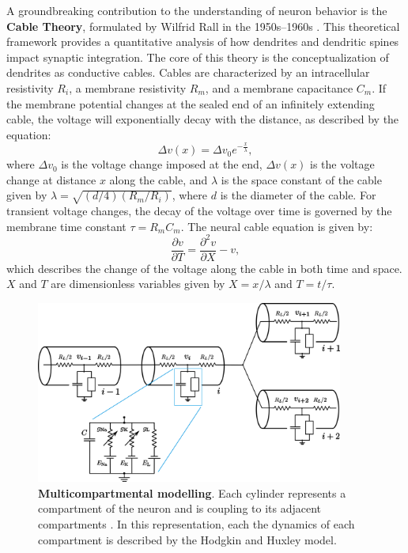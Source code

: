 \documentclass[../main.tex]{subfiles}
\begin{document}
A groundbreaking contribution to the understanding of neuron behavior is the \textbf{Cable Theory}, formulated by Wilfrid Rall in the 1950s–1960s \citep{rall1959branching,rall1962electrophysiology}.
This theoretical framework provides a quantitative analysis of how dendrites and dendritic spines impact synaptic integration.
The core of this theory is the conceptualization of dendrites as conductive cables.
Cables are characterized by an intracellular resistivity $R_i$, a membrane resistivity $R_m$, and a membrane capacitance $C_m$.
If the membrane potential changes at the sealed end of an infinitely extending cable, the voltage will exponentially decay with the distance, as described by the equation: 
\begin{equation}
    \Delta v(x) = \Delta v_0 e^{-\frac{x}{\lambda}},
    \label{eq:cable-equation-decay}
\end{equation}
where $\Delta v_0$ is the voltage change imposed at the end, $\Delta v(x)$ is the voltage change at distance $x$ along the cable, and $\lambda$ is the space constant of the cable given by $\lambda = \sqrt{(d/4)(R_m/R_i)}$, where $d$ is the diameter of the cable.
For transient voltage changes, the decay of the voltage over time is governed by the membrane time constant $\tau = R_mC_m$.
The neural cable equation is given by:
\begin{equation}
    \displaystyle\frac{\partial v}{\partial T} = \displaystyle\frac{\partial^2 v}{\partial X} - v,
\end{equation}
which describes the change of the voltage along the cable in both time and space.
$X$ and $T$ are dimensionless variables given by $X = x/\lambda$ and $T = t/\tau$.
\begin{figure}[!htb]%
    \centering
    \includegraphics[width=0.9\textwidth]{chapter1/figures/cable_theory.png}
    \caption{\textbf{Multicompartmental modelling}.
    Each cylinder represents a compartment of the neuron and is coupling to its adjacent compartments . 
    In this representation, each the dynamics of each compartment is described by the Hodgkin and Huxley model.}
    \label{fig:cable-theory}
\end{figure}
\end{document}
